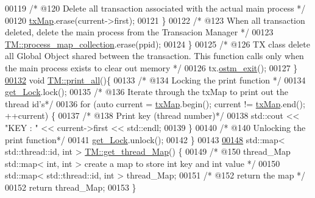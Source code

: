 \begin{DoxyCode}
00119             \textcolor{comment}{/* @120 Delete all transaction associated with the actual main process */}
00120             \hyperlink{class_t_m_a0333dfa193ea99d7626de74a2b932e9b_a0333dfa193ea99d7626de74a2b932e9b}{txMap}.erase(current->first);
00121         \}
00122         \textcolor{comment}{/* @123 When all transaction deleted, delete the main process from the Transacion Manager */}
00123         \hyperlink{class_t_m_a6d417b18213968da2a70a914e80d639b_a6d417b18213968da2a70a914e80d639b}{TM::process\_map\_collection}.erase(ppid);
00124     \}
00125     \textcolor{comment}{/* @126 TX class delete all Global Object shared between the transaction. This function calls only when
       the main process exists to clear out memory */}
00126     tx.\hyperlink{class_t_x_aa9739c5c2077454c779098db7baefc2b_aa9739c5c2077454c779098db7baefc2b}{ostm\_exit}();
00127 \}
\hypertarget{_t_m_8cpp_source.tex_l00132}{}\hyperlink{class_t_m_a1d6891b1d3e71cc0acef54e7afe71c09_a1d6891b1d3e71cc0acef54e7afe71c09}{00132} \textcolor{keywordtype}{void} \hyperlink{class_t_m_a1d6891b1d3e71cc0acef54e7afe71c09_a1d6891b1d3e71cc0acef54e7afe71c09}{TM::print\_all}()\{
00133     \textcolor{comment}{/* @134 Locking the print function */}
00134     \hyperlink{class_t_m_a123bc5aa0766a7b909bebc54a429e5b0_a123bc5aa0766a7b909bebc54a429e5b0}{get\_Lock}.lock();
00135     \textcolor{comment}{/* @136 Iterate through the txMap to print out the thread id's*/}
00136     \textcolor{keywordflow}{for} (\textcolor{keyword}{auto} current = \hyperlink{class_t_m_a0333dfa193ea99d7626de74a2b932e9b_a0333dfa193ea99d7626de74a2b932e9b}{txMap}.begin(); current != \hyperlink{class_t_m_a0333dfa193ea99d7626de74a2b932e9b_a0333dfa193ea99d7626de74a2b932e9b}{txMap}.end(); ++current) \{
00137         \textcolor{comment}{/* @138 Print key (thread number)*/}
00138         std::cout << \textcolor{stringliteral}{"KEY : "} << current->first << std::endl;
00139     \}
00140     \textcolor{comment}{/* @140 Unlocking the print function*/}
00141     \hyperlink{class_t_m_a123bc5aa0766a7b909bebc54a429e5b0_a123bc5aa0766a7b909bebc54a429e5b0}{get\_Lock}.unlock();
00142 \}
00143 
\hypertarget{_t_m_8cpp_source.tex_l00148}{}\hyperlink{class_t_m_afb8bc9f42fe06c52747beb7f4c46915c_afb8bc9f42fe06c52747beb7f4c46915c}{00148} std::map< std::thread::id, int > \hyperlink{class_t_m_afb8bc9f42fe06c52747beb7f4c46915c_afb8bc9f42fe06c52747beb7f4c46915c}{TM::get\_thread\_Map}() \{
00149     \textcolor{comment}{/*  @150 thread\_Map std::map< int, int > create a map to store int key and int value */} 
00150     std::map< std::thread::id, int > thread\_Map;
00151     \textcolor{comment}{/* @152 return the map */}
00152     \textcolor{keywordflow}{return} thread\_Map;
00153 \}
\end{DoxyCode}

